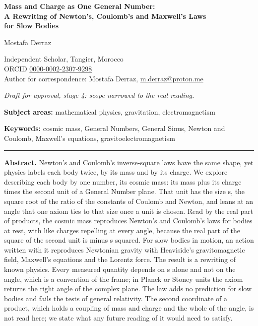 \documentclass[11pt,a4paper]{article}
\theoremstyle{plain}
\theoremstyle{definition}
\theoremstyle{remark}
\begin{document}
\begin{center}
{\LARGE\bfseries Mass and Charge as One General Number:\\[3pt] A Rewriting of Newton's, Coulomb's and Maxwell's Laws\\[3pt] for Slow Bodies\par}
\vspace{1.1em}
{\large Mostafa Derraz\par}
\vspace{0.4em}
{\small Independent Scholar, Tangier, Morocco\\
ORCID \href{https://orcid.org/0000-0002-2307-9298}{0000-0002-2307-9298}\\[2pt]
Author for correspondence: Mostafa Derraz, \href{mailto:m.derraz@proton.me}{m.derraz@proton.me}\par}
\vspace{0.6em}
{\small\color{black!55}\itshape Draft for approval, stage 4: scope narrowed to the real reading.\par}
\end{center}

\vspace{0.4em}
\noindent\textbf{Subject areas:} mathematical physics, gravitation, electromagnetism

\smallskip
\noindent\textbf{Keywords:} cosmic mass, General Numbers, General Sinus, Newton and Coulomb, Maxwell's equations, gravitoelectromagnetism

\begin{center}\rule{0.6\textwidth}{0.4pt}\end{center}

\noindent\textbf{Abstract.}
Newton's and Coulomb's inverse-square laws have the same shape, yet physics labels each body twice, by its mass and by its charge. We explore describing each body by one number, its cosmic mass: its mass plus its charge times the second unit of a General Number plane. That unit has the size s, the square root of the ratio of the constants of Coulomb and Newton, and leans at an angle that one axiom ties to that size once a unit is chosen. Read by the real part of products, the cosmic mass reproduces Newton's and Coulomb's laws for bodies at rest, with like charges repelling at every angle, because the real part of the square of the second unit is minus s squared. For slow bodies in motion, an action written with it reproduces Newtonian gravity with Heaviside's gravitomagnetic field, Maxwell's equations and the Lorentz force. The result is a rewriting of known physics. Every measured quantity depends on s alone and not on the angle, which is a convention of the frame; in Planck or Stoney units the axiom returns the right angle of the complex plane. The law adds no prediction for slow bodies and fails the tests of general relativity. The second coordinate of a product, which holds a coupling of mass and charge and the whole of the angle, is not read here; we state what any future reading of it would need to satisfy.
\end{document}
